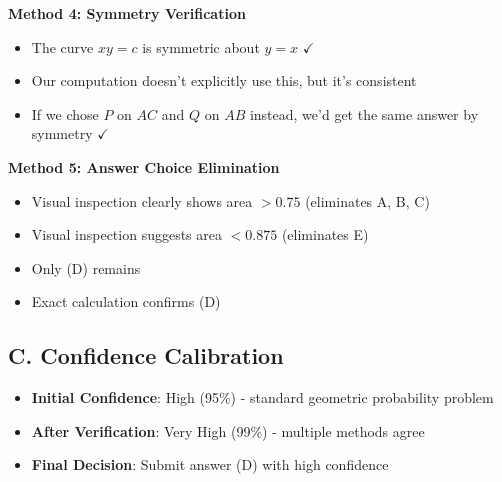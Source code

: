 \documentclass[11pt]{article}
\begin{document}
\begin{verificationbox}
\textbf{Method 4: Symmetry Verification}
\begin{itemize}
    \item The curve $xy = c$ is symmetric about $y = x$ $\checkmark$
    \item Our computation doesn't explicitly use this, but it's consistent
    \item If we chose $P$ on $AC$ and $Q$ on $AB$ instead, we'd get the same answer by symmetry $\checkmark$
\end{itemize}

\textbf{Method 5: Answer Choice Elimination}
\begin{itemize}
    \item Visual inspection clearly shows area $> 0.75$ (eliminates A, B, C)
    \item Visual inspection suggests area $< 0.875$ (eliminates E)
    \item Only (D) remains
    \item Exact calculation confirms (D)
\end{itemize}

\subsection*{C. Confidence Calibration}
\begin{itemize}[leftmargin=*]
    \item \textbf{Initial Confidence}: High (95\%) - standard geometric probability problem
    \item \textbf{After Verification}: Very High (99\%) - multiple methods agree
    \item \textbf{Final Decision}: Submit answer (D) with high confidence
\end{itemize}
\end{verificationbox}
\end{document}
